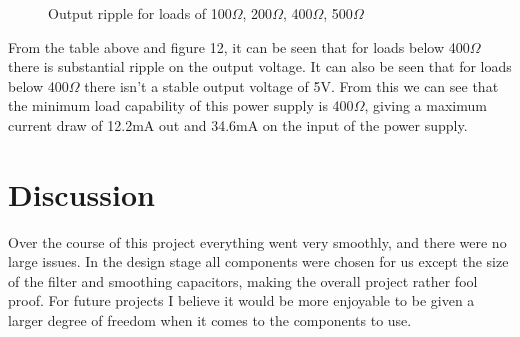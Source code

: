 \documentclass[a4paper,11pt]{article}
\begin{document}
\begin{figure}[h]
 \begin{center}
  \caption{Output ripple for loads of 100$\Omega$, 200$\Omega$, 400$\Omega$, 500$\Omega$}
 \end{center}
\end{figure}

From the table above and figure 12, it can be seen that for loads below 400$\Omega$ there is substantial ripple on the output voltage. It can also be seen that for loads below 400$\Omega$ there isn't a stable output voltage of 5V. From this we can see that the minimum load capability of this power supply is 400$\Omega$, giving a maximum current draw of 12.2mA out and 34.6mA on the input of the power supply. 

\pagebreak

\section{Discussion}

Over the course of this project everything went very smoothly, and there were no large issues. In the design stage all components were chosen for us except the size of the filter and smoothing capacitors, making the overall project rather fool proof. For future projects I believe it would be more enjoyable to be given a larger degree of freedom when it comes to the components to use. 
\end{document}
